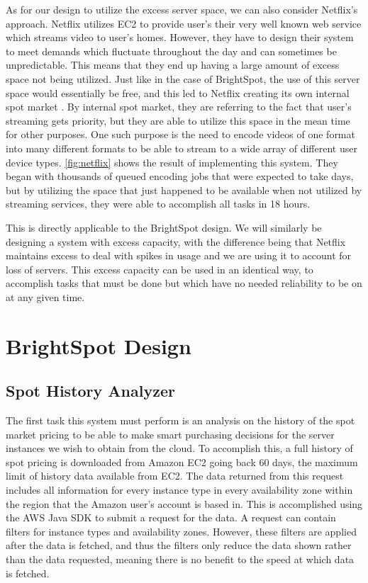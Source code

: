\documentclass[thesis,proposal]{umassthesis}  %
\begin{document}
As for our design to utilize the excess server space, we can also consider Netflix's approach. Netflix utilizes EC2 to provide user's their very well known web service which streams video to user's homes. However, they have to design their system to meet demands which fluctuate throughout the day and can sometimes be unpredictable. This means that they end up having a large amount of excess space not being utilized. Just like in the case of BrightSpot, the use of this server space would essentially be free, and this led to Netflix creating its own internal spot market \cite{netflixSpot}. By internal spot market, they are referring to the fact that user's streaming gets priority, but they are able to utilize this space in the mean time for other purposes. One such purpose is the need to encode videos of one format into many different formats to be able to stream to a wide array of different user device types. \ref{fig:netflix} shows the result of implementing this system. They began with thousands of queued encoding jobs that were expected to take days, but by utilizing the space that just happened to be available when not utilized by streaming services, they were able to accomplish all tasks in 18 hours.\par

This is directly applicable to the BrightSpot design. We will similarly be designing a system with excess capacity, with the difference being that Netflix maintains excess to deal with spikes in usage and we are using it to account for loss of servers. This excess capacity can be used in an identical way, to accomplish tasks that must be done but which have no needed reliability to be on at any given time.\par







\chapter{BrightSpot Design}

\section{Spot History Analyzer}

The first task this system must perform is an analysis on the history of the spot market pricing to be able to make smart purchasing decisions for the server instances we wish to obtain from the cloud. To accomplish this, a full history of spot pricing is downloaded from Amazon EC2 going back 60 days, the maximum limit of history data available from EC2. The data returned from this request includes all information for every instance type in every availability zone within the region that the Amazon user's account is based in. This is accomplished using the AWS Java SDK to submit a request for the data. A request can contain filters for instance types and availability zones. However, these filters are applied after the data is fetched, and thus the filters only reduce the data shown rather than the data requested, meaning there is no benefit to the speed at which data is fetched.\par
\end{document}
